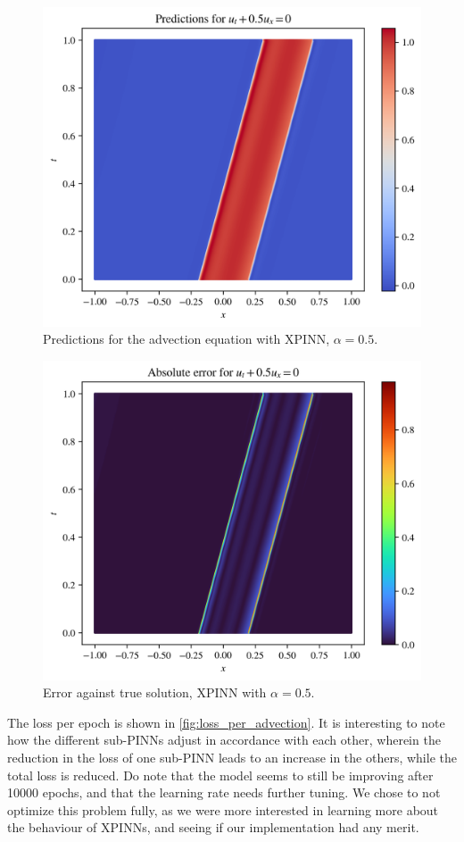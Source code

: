 \begin{figure}[h]
    \centering
    \includegraphics[width=0.8\linewidth]{Project1XPINNs/figures/advection/0.5_predictions.png}
    \caption{Predictions for the advection equation with XPINN, $\alpha = 0.5$.}
    \label{fig:advection_xpinn_pred}
\end{figure}

\begin{figure}[h]
    \centering
    \includegraphics[width=0.8\linewidth]{Project1XPINNs/figures/advection/0.5_error.png}
    \caption{Error against true solution, XPINN with $\alpha=0.5$.}
    \label{fig:advection_xpinn_error}
\end{figure}

The loss per epoch is shown in \autoref{fig:loss_per_advection}.
It is interesting to note how the different sub-PINNs adjust in accordance with each other, wherein the reduction in the loss of one sub-PINN leads to an increase in the others, while the total loss is reduced.
Do note that the model seems to still be improving after 10000 epochs, and that the learning rate needs further tuning.
We chose to not optimize this problem fully, as we were more interested in learning more about the behaviour of XPINNs, and seeing if our implementation had any merit.

